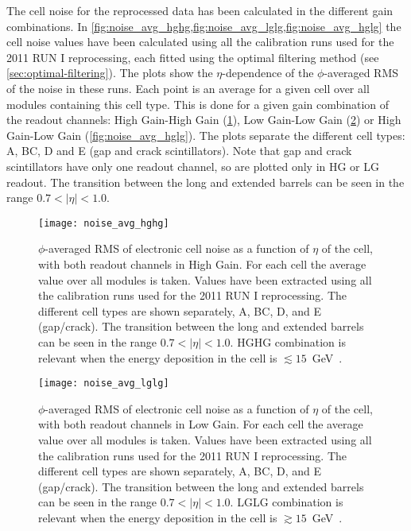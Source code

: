 The cell noise for the reprocessed data has been calculated in the different
gain combinations. In
\cref{fig:noise_avg_hghg,fig:noise_avg_lglg,fig:noise_avg_hglg} the cell noise
values have been calculated using all the calibration runs used for the 2011 RUN
I reprocessing, each fitted using the optimal filtering method (see
\cref{sec:optimal-filtering}). The plots show the $\eta$-dependence of the
$\phi$-averaged RMS of the noise in these runs. Each point is an average for a
given cell over all modules containing this cell type. This is done for a given
gain combination of the readout channels: High Gain-High Gain
(\cref{fig:noise_avg_hghg}), Low Gain-Low Gain (\cref{fig:noise_avg_lglg}) or
High Gain-Low Gain (\cref{fig:noise_avg_hglg}). The plots separate the
different cell types: A, BC, D and E (gap and crack scintillators). Note that
gap and crack scintillators have only one readout channel, so are plotted only
in HG or LG readout. The transition between the long and extended barrels can be
seen in the range $0.7 < |\eta| < 1.0$.
\begin{figure}[!h]
  \centering
    \texttt{[image: noise\_avg\_hghg]}
    \caption{$\phi$-averaged RMS of electronic cell noise as a function of
      $\eta$ of the cell, with both readout channels in High Gain. For each cell
      the average value over all modules is taken. Values have been extracted
      using all the calibration runs used for the 2011 RUN I reprocessing. The
      different cell types are shown separately, A, BC, D, and E
      (gap/crack). The transition between the long and extended barrels can be
      seen in the range $0.7 < |\eta| < 1.0$. HGHG combination is relevant when
      the energy deposition in the cell is
      $\lesssim 15$~GeV~\cite{MyTileCalPlots}.}
    \label{fig:noise_avg_hghg}
\end{figure}

\begin{figure}[!h]
  \centering
    \texttt{[image: noise\_avg\_lglg]}
    \caption{$\phi$-averaged RMS of electronic cell noise as a function of
      $\eta$ of the cell, with both readout channels in Low Gain. For each cell
      the average value over all modules is taken. Values have been extracted
      using all the calibration runs used for the 2011 RUN I reprocessing. The
      different cell types are shown separately, A, BC, D, and E
      (gap/crack). The transition between the long and extended barrels can be
      seen in the range $0.7 < |\eta| < 1.0$. LGLG combination is relevant when
      the energy deposition in the cell is
      $\gtrsim 15$~GeV~\cite{MyTileCalPlots}.}
    \label{fig:noise_avg_lglg}
\end{figure}

